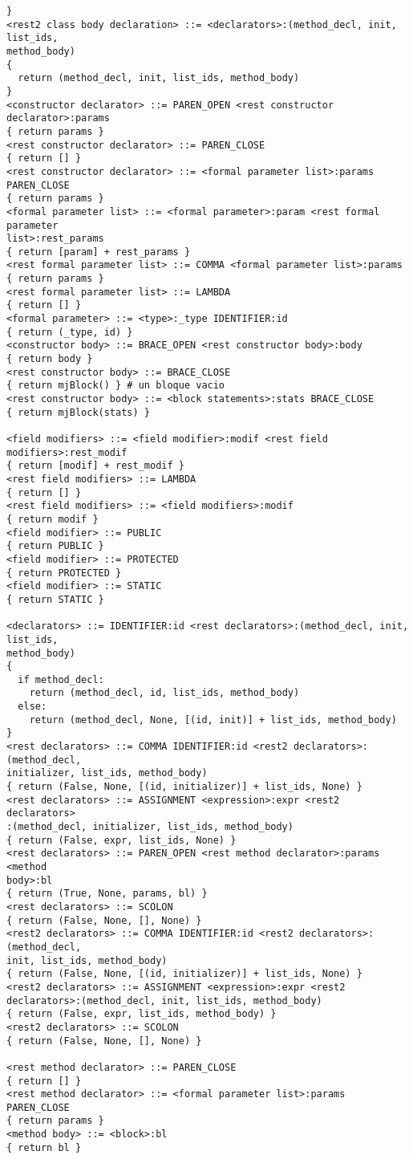 \documentclass [a4paper,abstracton,titlepage]{scrartcl}
\begin{document}
\begin{lstlisting}
}
<rest2 class body declaration> ::= <declarators>:(method_decl, init, list_ids,
method_body)
{
  return (method_decl, init, list_ids, method_body)
}
<constructor declarator> ::= PAREN_OPEN <rest constructor declarator>:params
{ return params }
<rest constructor declarator> ::= PAREN_CLOSE
{ return [] }
<rest constructor declarator> ::= <formal parameter list>:params PAREN_CLOSE
{ return params }
<formal parameter list> ::= <formal parameter>:param <rest formal parameter
list>:rest_params
{ return [param] + rest_params }
<rest formal parameter list> ::= COMMA <formal parameter list>:params
{ return params }
<rest formal parameter list> ::= LAMBDA
{ return [] }
<formal parameter> ::= <type>:_type IDENTIFIER:id 
{ return (_type, id) }
<constructor body> ::= BRACE_OPEN <rest constructor body>:body
{ return body }
<rest constructor body> ::= BRACE_CLOSE
{ return mjBlock() } # un bloque vacio
<rest constructor body> ::= <block statements>:stats BRACE_CLOSE
{ return mjBlock(stats) }

<field modifiers> ::= <field modifier>:modif <rest field modifiers>:rest_modif
{ return [modif] + rest_modif }
<rest field modifiers> ::= LAMBDA
{ return [] }
<rest field modifiers> ::= <field modifiers>:modif
{ return modif }
<field modifier> ::= PUBLIC
{ return PUBLIC }
<field modifier> ::= PROTECTED
{ return PROTECTED }
<field modifier> ::= STATIC
{ return STATIC }

<declarators> ::= IDENTIFIER:id <rest declarators>:(method_decl, init, list_ids,
method_body)
{
  if method_decl:
    return (method_decl, id, list_ids, method_body)
  else:
    return (method_decl, None, [(id, init)] + list_ids, method_body)
}
<rest declarators> ::= COMMA IDENTIFIER:id <rest2 declarators>:(method_decl,
initializer, list_ids, method_body)
{ return (False, None, [(id, initializer)] + list_ids, None) }
<rest declarators> ::= ASSIGNMENT <expression>:expr <rest2 declarators>
:(method_decl, initializer, list_ids, method_body)
{ return (False, expr, list_ids, None) }
<rest declarators> ::= PAREN_OPEN <rest method declarator>:params <method
body>:bl
{ return (True, None, params, bl) }
<rest declarators> ::= SCOLON
{ return (False, None, [], None) }
<rest2 declarators> ::= COMMA IDENTIFIER:id <rest2 declarators>:(method_decl,
init, list_ids, method_body)
{ return (False, None, [(id, initializer)] + list_ids, None) }
<rest2 declarators> ::= ASSIGNMENT <expression>:expr <rest2
declarators>:(method_decl, init, list_ids, method_body)
{ return (False, expr, list_ids, method_body) }
<rest2 declarators> ::= SCOLON
{ return (False, None, [], None) }

<rest method declarator> ::= PAREN_CLOSE
{ return [] }
<rest method declarator> ::= <formal parameter list>:params PAREN_CLOSE
{ return params }
<method body> ::= <block>:bl
{ return bl }
    \end{lstlisting}
    
\end{document}
